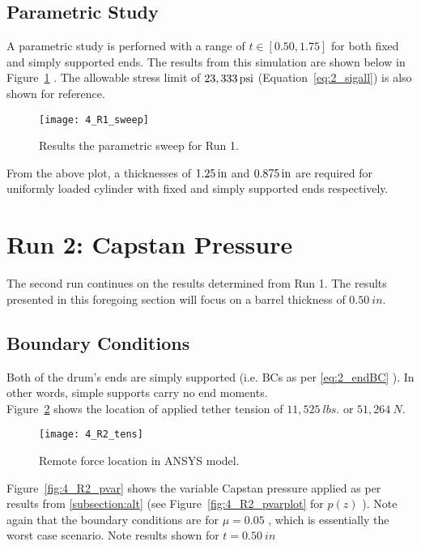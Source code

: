 \subsection{Parametric Study}

A parametric study is perforned with a range of $t \in [0.50, 1.75]$ for both fixed and simply supported ends. The results from this simulation are shown below in Figure~\ref{fig:4_R1_sweep} \cite{EXCEL}. The allowable stress limit of $23,333 \,\mathrm{psi}$ (Equation~\ref{eq:2_sigall}) is also shown for reference.

\begin{figure}[H]
	\centering
	\texttt{[image: 4\_R1\_sweep]}
	\caption{Results the parametric sweep for Run 1.}
	\label{fig:4_R1_sweep}
\end{figure}

From the above plot, a thicknesses of $1.25 \,\mathrm{in}$ and $0.875\,\mathrm{in}$ are required for uniformly loaded cylinder with fixed and simply supported ends respectively.

\section{Run 2: Capstan Pressure}
\label{section:4_R2}
The second run continues on the results determined from Run 1. The results presented in this foregoing section will focus on a barrel thickness of $0.50\ in$.

\subsection{Boundary Conditions}

Both of the drum's ends are simply supported (i.e. BCs as per \ref{eq:2_endBC} ). In other words, simple supports carry no end moments.\\

Figure~\ref{fig:4_R2_tens} shows the location of applied tether tension of $11,525\ lbs.$ or $51,264\ N$.
\begin{figure}[H]
	\centering
	\texttt{[image: 4\_R2\_tens]}
	\caption{Remote force location in ANSYS model.}
	\label{fig:4_R2_tens}
\end{figure}

Figure~\ref{fig:4_R2_pvar} shows the variable Capstan pressure applied as per results from \ref{subsection:alt} (see Figure~\ref{fig:4_R2_pvarplot} for $p(z)$ ). Note again that the boundary conditions are for $\mu=0.05$ , which is essentially the worst case scenario. Note results shown for $t=0.50\ in$


